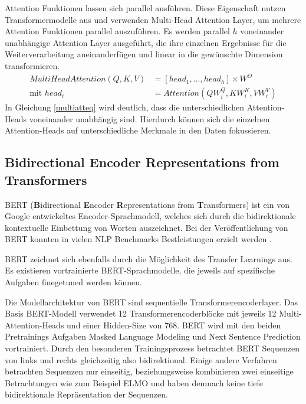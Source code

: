 \pagebreak
Attention Funktionen lassen sich parallel ausführen. Diese Eigenschaft nutzen Transformermodelle aus und verwenden Multi-Head Attention Layer, um mehrere Attention Funktionen parallel auszuführen.
Es werden parallel $h$ voneinander unabhängige Attention Layer ausgeführt, die ihre einzelnen Ergebnisse für die Weiterverarbeitung aneinanderfügen und linear in die gewünschte Dimension transformieren. 
\begin{equation}
    \label{multiatteq}
    \begin{split}
    MultiHeadAttention(Q,K,V) &= [head_1, \ldots, head_h] \times W^{O} \\
    \text{mit } head_i &= Attention(QW_i^Q,KW_i^K,VW_i^V)
    \end{split}
\end{equation}
In Gleichung \ref{multiatteq} wird deutlich, dass die unterschiedlichen Attention-Heads voneinander unabhängig sind. Hierdurch können sich die einzelnen Attention-Heads auf unterschiedliche Merkmale in den Daten fokussieren.



    


\subsection{\textbf{B}idirectional \textbf{E}ncoder \textbf{R}epresentations from \textbf{T}ransformers}
BERT (\textbf{B}idirectional \textbf{E}ncoder \textbf{R}epresentations from \textbf{T}ransformers) ist ein von Google \citep{DBLP:journals/corr/abs-1810-04805} entwickeltes Encoder-Sprachmodell, welches sich durch die bidirektionale kontextuelle Einbettung von Worten auszeichnet.
Bei der Veröffentlichung von BERT konnten in vielen NLP Benchmarks Bestleistungen erzielt werden \citep{DBLP:journals/corr/abs-1810-04805}. 

BERT zeichnet sich ebenfalls durch die Möglichkeit des Transfer Learnings aus. Es existieren vortrainierte BERT-Sprachmodelle, die jeweils auf spezifische Aufgaben finegetuned werden können.

Die Modellarchitektur von BERT sind sequentielle Transformerencoderlayer. Das Basis BERT-Modell verwendet 12 Transformerencoderblöcke mit jeweils 12 Multi-Attention-Heads und einer Hidden-Size von 768.
BERT wird mit den beiden Pretrainings Aufgaben Masked Language Modeling und Next Sentence Prediction vortrainiert. Durch den besonderen Trainingsprozess betrachtet BERT Sequenzen von links und rechts gleichzeitig also bidirektional. Einige andere Verfahren betrachten Sequenzen nur einseitig, beziehungsweise kombinieren zwei einseitige Betrachtungen wie zum Beispiel ELMO \citep{elmo} und haben demnach keine tiefe bidirektionale Repräsentation der Sequenzen.

